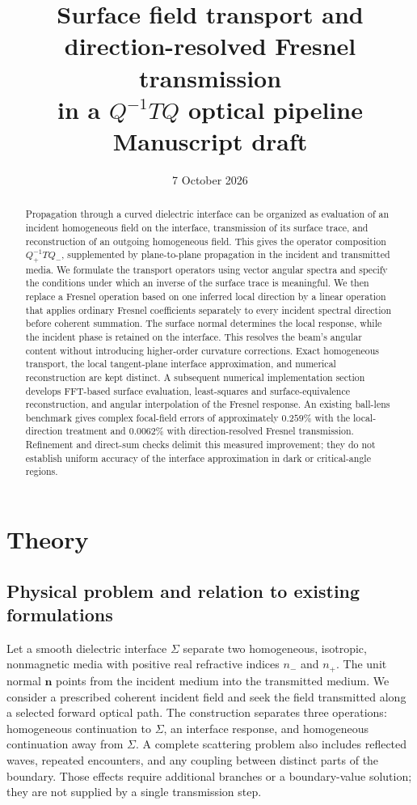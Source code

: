 \documentclass[11pt,a4paper]{article}
\title{Surface field transport and direction-resolved Fresnel transmission\\
 in a $Q^{-1}TQ$ optical pipeline\\[4pt]
\large Manuscript draft}
\author{}
\date{7 October 2026}
\newcommand{\vct}[1]{\bm{#1}}
\numberwithin{equation}{section}
\begin{document}
\maketitle
\begin{abstract}
Propagation through a curved dielectric interface can be organized as evaluation
of an incident homogeneous field on the interface, transmission of its surface
trace, and reconstruction of an outgoing homogeneous field. This gives the
operator composition $Q_+^{-1}TQ_-$, supplemented by plane-to-plane propagation
in the incident and transmitted media. We formulate the transport operators
using vector angular spectra and specify the conditions under which an inverse
of the surface trace is meaningful. We then replace a Fresnel operation based
on one inferred local direction by a linear operation that applies ordinary
Fresnel coefficients separately to every incident spectral direction before
coherent summation. The surface normal determines the local response, while
the incident phase is retained on the interface. This resolves the beam's
angular content without introducing higher-order curvature corrections.
Exact homogeneous transport, the local tangent-plane interface approximation,
and numerical reconstruction are kept distinct. A subsequent numerical
implementation section develops FFT-based surface evaluation, least-squares
and surface-equivalence reconstruction, and angular interpolation of the
Fresnel response. An existing ball-lens benchmark gives complex focal-field
errors of approximately $0.259\%$ with the local-direction treatment and
$0.0062\%$ with direction-resolved Fresnel transmission. Refinement and direct-sum
checks delimit this measured improvement; they do not establish uniform
accuracy of the interface approximation in dark or critical-angle regions.
\end{abstract}

\section{Theory}
\label{sec:theory}

\subsection{Physical problem and relation to existing formulations}

Let a smooth dielectric interface $\Sigma$ separate two homogeneous, isotropic,
nonmagnetic media with positive real refractive indices $n_-$ and $n_+$.
The unit normal $\vct n$ points from the incident medium into the transmitted
medium. We consider a prescribed coherent incident field and seek the field
transmitted along a selected forward optical path. The construction separates
three operations: homogeneous continuation to $\Sigma$, an interface response,
and homogeneous continuation away from $\Sigma$. A complete scattering problem
also includes reflected waves, repeated encounters, and any coupling between
distinct parts of the boundary. Those effects require additional branches or
a boundary-value solution; they are not supplied by a single transmission step.
\end{document}
